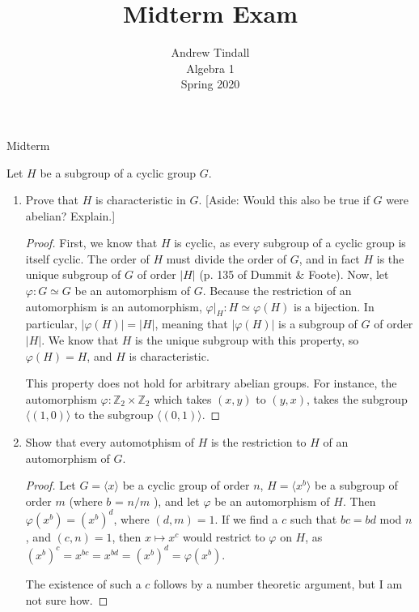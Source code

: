 \documentclass[12pt]{article}
\newcommand{\Z}{\mathbb{Z}}
\theoremstyle{definition}
\newenvironment{problem}[2][Problem]{\begin{trivlist}
\item[\hskip \labelsep {\bfseries #1}\hskip \labelsep {\bfseries #2.}]}{\end{trivlist}}
\begin{document}
 
 
\title{Midterm Exam}
\author{Andrew Tindall\\
Algebra 1\\
Spring 2020}
 
\maketitle
\begin{section}{Midterm}
\begin{problem}{1}
	Let $H$ be a subgroup of a cyclic group $G$.
	\begin{enumerate}[label=(\alph*)]
		\item Prove that $H$ is characteristic in $G$. [Aside: Would this also be true if $G$ were abelian? Explain.]
			\begin{proof}
				First, we know that $H$ is cyclic, as every subgroup of a cyclic group is itself cyclic. The order of $H$ must divide the order of $G$, and in fact $H$ is the unique subgroup of $G$ of order $\left \lvert { H } \right \lvert $ (p. 135 of Dummit \& Foote). Now, let $\varphi: G \simeq G$ be an automorphism of $G$. Because the restriction of an automorphism is an automorphism, $\varphi\lvert_H: H \simeq \varphi(H) $ is a bijection. In particular, $\left \lvert { \varphi(H) } \right \lvert  = \left \lvert { H } \right \lvert $, meaning that $\left \lvert { \varphi(H) } \right \lvert $ is a subgroup of $G$ of order $\lvert H \rvert$. We know that $H$ is the unique subgroup with this property, so $\varphi(H) = H$, and $H$ is characteristic.
				\par This property does not hold for arbitrary abelian groups. For instance, the automorphism $\varphi: \Z_2 \times \Z_2$ which takes $(x,y)$ to $(y,x)$, takes the subgroup $\langle (1,0)\rangle$ to the subgroup $\langle (0,1)\rangle$.
			\end{proof}
		\item Show that every automotphism of $H$ is the restriction to $H$ of an automorphism of $G$.
			\begin{proof}	
				Let $G = \langle x\rangle$ be a cyclic group of order $n$, $H = \langle x^b\rangle$ be a subgroup of order $m$ (where $b$ = $n/m$ ), and let $\varphi$ be an automorphism of $H$. Then $\varphi(x^b) = (x^b)^d$, where $(d,m) = 1$. If we find a $c$ such that $bc = bd$ mod $n$, and $(c,n) = 1$, then $x \mapsto x^c$ would restrict to $\varphi$ on $H$, as $(x^b)^c = x^{bc} = x^{bd} = (x^{b})^d = \varphi(x^b)$.
				\par The existence of such a $c$ follows by a number theoretic argument, but I am not sure how.

\end{proof}
\end{enumerate}
\end{problem}
\end{section}
\end{document}
